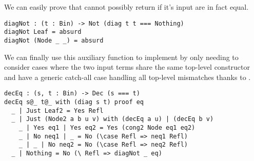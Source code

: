 \noindent
We can easily prove that  cannot possibly return 
if it's input are in fact equal.

\begin{verbatim}
diagNot : (t : Bin) -> Not (diag t t === Nothing)
diagNot Leaf = absurd
diagNot (Node _ _) = absurd
\end{verbatim}

\noindent
We can finally use this auxiliary function to implement 
by only needing to consider cases where the two input terms share the same
top-level constructor and have a generic catch-all case handling all top-level
mismatches thanks to .

\begin{verbatim}
decEq : (s, t : Bin) -> Dec (s === t)
decEq s@_ t@_ with (diag s t) proof eq
  _ | Just Leaf2 = Yes Refl
  _ | Just (Node2 a b u v) with (decEq a u) | (decEq b v)
    _ | Yes eq1 | Yes eq2 = Yes (cong2 Node eq1 eq2)
    _ | No neq1 | _ = No (\case Refl => neq1 Refl)
    _ | _ | No neq2 = No (\case Refl => neq2 Refl)
  _ | Nothing = No (\ Refl => diagNot _ eq)
\end{verbatim}



